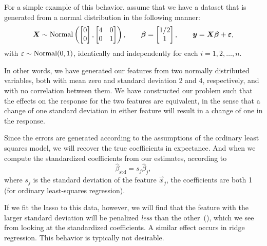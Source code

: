 For a simple example of this behavior, assume that we have a dataset that is generated from a normal distribution in the following manner:
\[
  \boldsymbol{X} \sim \operatorname{Normal}\left(\begin{bmatrix}0 \\ 0\end{bmatrix}, \begin{bmatrix} 4 & 0 \\ 0 & 1\end{bmatrix}\right), \qquad \boldsymbol{\beta} = \begin{bmatrix} 1/2 \\ 1 \end{bmatrix}, \qquad \boldsymbol{y} = \boldsymbol{X}\boldsymbol{\beta} + \boldsymbol{\varepsilon},
\]
with \(\varepsilon \sim \operatorname{Normal}(0,1)\), identically and independently for each \(i = 1,2,\dots,n\).

In other words, we have generated our features from two normally distributed variables, both with mean zero and standard deviation 2 and 4, respectively, and with no correlation between them. We have constructed our problem such that the effects on the response for the two features are equivalent, in the sense that a change of one standard deviation in either feature will result in a change of one in the response.

Since the errors are generated according to the assumptions of the ordinary least squares model, we will recover the true coefficients in expectance. And when we compute the standardized coefficients from our estimates, according to
\[
  \hat{\beta}_\text{std} = s_j\hat{\beta}_j,
\]
where \(s_j\) is the standard deviation of the feature \(\vec{x}_j\), the coefficients are both 1 (for ordinary least-squares regression).

If we fit the lasso to this data, however, we will find that the feature with the larger standard deviation will be penalized \emph{less} than the other~(), which we see from looking at the standardized coefficients. A similar effect occurs in ridge regression. This behavior is typically not desirable.


